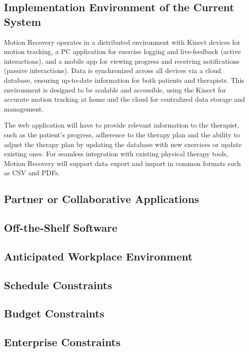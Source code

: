 \subsection{Implementation Environment of the Current System}
Motion Recovery operates in a distributed environment with Kinect devices for motion tracking, a PC application for exercise logging and live-feedback (active interactions), and a mobile app for viewing progress and receiving notifications (passive interactions). Data is synchronized across all devices via a cloud database, ensuring up-to-date information for both patients and therapists. This environment is designed to be scalable and accessible, using the Kinect for accurate motion tracking at home and the cloud for centralized data storage and management.\par
The web application will have to provide relevant information to the therapist, such as the patient's progress, adherence to the therapy plan and the ability to adjust the therapy plan by updating the database with new exercices or update existing ones. For seamless integration with existing physical therapy tools, Motion Recovery will support data export and import in common formats such as CSV and PDFs.   
\vfill

\subsection{Partner or Collaborative Applications}
\subsection{Off-the-Shelf Software}
\subsection{Anticipated Workplace Environment}
\subsection{Schedule Constraints}
\subsection{Budget Constraints}
\subsection{Enterprise Constraints}